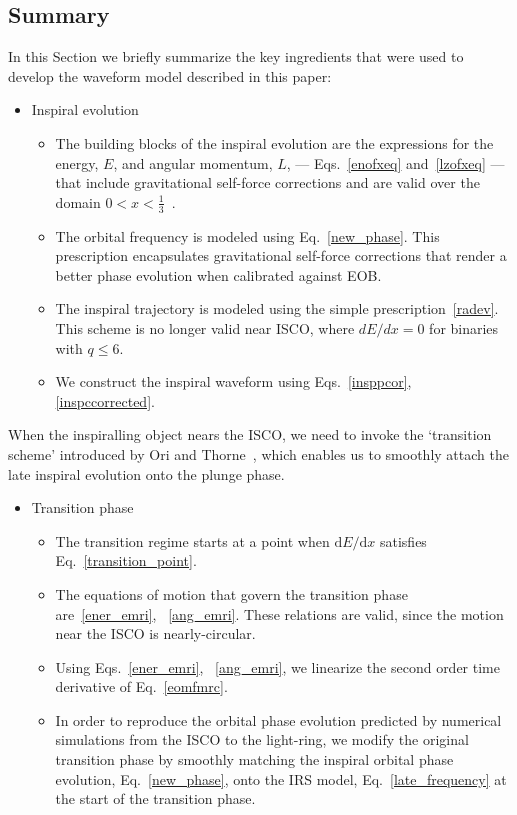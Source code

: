 \documentclass[aps,prd,showpacs,amssymb,floatfix,nofootinbib,superscriptaddress]{revtex4-1}%
\begin{document}
\subsection{Summary}
In this Section we briefly summarize the key ingredients that were used to develop the waveform model described in this paper:
\begin{itemize}
\item{Inspiral evolution}
\begin{itemize}
\item The building blocks of the inspiral evolution are the expressions for the energy, \(E\), and angular momentum, \(L\), --- Eqs.~\eqref{enofxeq} and~\eqref{lzofxeq} --- that include gravitational self-force corrections and are valid over the domain \(0<x<\frac{1}{3}\)~\cite{Akcay:2012}.
\item The orbital frequency is modeled using Eq.~\eqref{new_phase}. This prescription encapsulates gravitational self-force corrections that render a better phase evolution when calibrated against EOB.
\item The inspiral trajectory is modeled using the simple prescription~\eqref{radev}. This scheme is no longer valid near ISCO, where \(dE/dx =0\) for binaries with \(q\leq 6\).
\item We construct the inspiral waveform using Eqs.~\eqref{insppcor}, \eqref{inspccorrected}.
\end{itemize}
\end{itemize}

When the inspiralling object nears the ISCO, we need to invoke the `transition scheme' introduced by Ori and Thorne~\cite{amos}, which enables us to smoothly attach the late inspiral evolution onto the plunge phase. 

\begin{itemize}
\item{Transition phase}
\begin{itemize}
\item The transition regime starts at a point when \( \mathrm{d} E/ \mathrm{d}  x\) satisfies Eq.~\eqref{transition_point}.
\item The equations of motion that govern the transition phase are~\eqref{ener_emri}, ~\eqref{ang_emri}. These relations are valid, since the motion near the ISCO is nearly-circular. 
\item Using Eqs.~\eqref{ener_emri}, ~\eqref{ang_emri}, we linearize the second order time derivative of Eq.~\eqref{eomfmrc}.
\item In order to reproduce the orbital phase evolution predicted by numerical simulations from the ISCO to the light-ring, we modify the original transition phase by smoothly matching the inspiral orbital phase evolution, Eq.~\eqref{new_phase}, onto the IRS model, Eq.~\eqref{late_frequency} at the start of the transition phase. 
\end{itemize}
\end{itemize}
\end{document}
